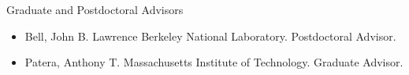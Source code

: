 \documentclass[11pt]{article}
\begin{document}
\vspace{.2 true in}
Graduate and Postdoctoral Advisors
\begin{itemize}
\item	Bell, John B. Lawrence Berkeley National Laboratory. Postdoctoral Advisor.
\item	Patera, Anthony T.  Massachusetts Institute of Technology. Graduate Advisor.
\end{itemize}
\end{document}
